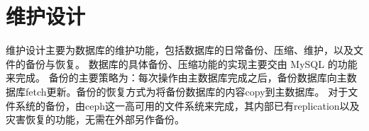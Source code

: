 \chapter{维护设计}
    维护设计主要为数据库的维护功能，包括数据库的日常备份、压缩、维护，以及文件的备份与恢复。
    数据库的具体备份、压缩功能的实现主要交由 MySQL 的功能来完成。
    备份的主要策略为：每次操作由主数据库完成之后，备份数据库向主数据库fetch更新。备份的恢复方式为将备份数据库的内容copy到主数据库。
    {\color{red}
    对于文件系统的备份，由ceph这一高可用的文件系统来完成，其内部已有replication以及灾害恢复的功能，无需在外部另作备份。
    }